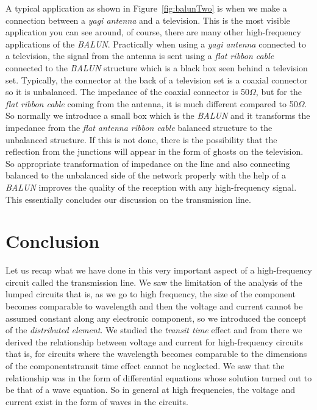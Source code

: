 A typical application as shown in Figure~\ref{fig:balunTwo} is when we make a connection between a \emph{yagi antenna} and a television. This is the most visible application you can see around, of course, there are many other high-frequency applications of the \emph{BALUN}. Practically when using a \emph{yagi antenna} connected to a television, the signal from the antenna is sent using a \emph{flat ribbon cable} connected to the \emph{BALUN} structure which is a black box seen behind a television set. Typically, the connector at the back of a television set is a coaxial connector so it is unbalanced. The impedance of the coaxial connector is 50$\varOmega$, but for the \emph{flat ribbon cable} coming from the antenna, it is much different compared to 50$\varOmega$. So normally we introduce a small box which is the \emph{BALUN} and it transforms the impedance from the \emph{flat antenna ribbon cable} balanced structure to the unbalanced structure. If this is not done, there is the possibility that the reflection from the junctions will appear in the form of ghosts on the television. So appropriate transformation of impedance on the line and also connecting balanced to the unbalanced side of the network properly with the help of a \emph{BALUN} improves the quality of the reception with any high-frequency signal. This essentially concludes our discussion on the transmission line.

\section{Conclusion}
Let us recap what we have done in this very important aspect of a high-frequency circuit called the transmission line. We saw the limitation of the analysis of the lumped circuits that is, as we go to high frequency, the size of the component becomes comparable to wavelength and then the voltage and current cannot be assumed constant along any electronic component, so we introduced the concept of the \emph{distributed element}. We studied the \emph{transit time} effect and from there we derived the relationship between voltage and current for high-frequency circuits that is, for circuits where the wavelength becomes comparable to the dimensions of the components\textemdash transit time effect cannot be neglected. We saw that the relationship was in the form of differential equations whose solution turned out to be that of a wave equation. So in general at high frequencies, the voltage and current exist in the form of waves in the circuits.

